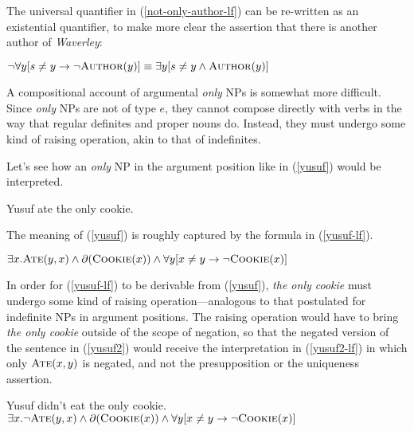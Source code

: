 The universal quantifier in (\ref{not-only-author-lf}) can be re-written as an existential quantifier, to make more clear the assertion that there is another author of \textit{Waverley}:

\begin{exe}
	\ex $\neg \forall y [ s \ne y \to \neg \textsc{Author}(y) ] \equiv \exists y [ s \ne y \land \textsc{Author}(y) ]$
\end{exe}

A compositional account of argumental \textit{only} NPs is somewhat more difficult. Since \textit{only} NPs are not of type $e$, they cannot compose directly with verbs in the way that regular definites and proper nouns do. Instead, they must undergo some kind of raising operation, akin to that of indefinites.


Let's see how an \textit{only} NP in the argument position like in (\ref{yusuf}) would be interpreted.

\begin{exe}
	\ex \label{yusuf} Yusuf ate the only cookie.
\end{exe}

The meaning of (\ref{yusuf}) is roughly captured by the formula in (\ref{yusuf-lf}).

\begin{exe}
	\ex \label{yusuf-lf} $\exists x . \textsc{Ate}(y, x) \land \partial(\textsc{Cookie}(x)) \land \forall y [ x \ne y \to \neg \textsc{Cookie}(x) ]$
\end{exe}

In order for (\ref{yusuf-lf}) to be derivable from (\ref{yusuf}), \textit{the only cookie} must undergo some kind of raising operation---analogous to that postulated for indefinite NPs in argument positions. The raising operation would have to bring \textit{the only cookie} outside of the scope of negation, so that the negated version of the sentence in (\ref{yusuf2}) would receive the interpretation in (\ref{yusuf2-lf}) in which only $\textsc{Ate}(x, y)$ is negated, and not the presupposition or the uniqueness assertion.

\begin{exe}
	\ex \label{yusuf2} Yusuf didn't eat the only cookie.
	\ex \label{yusuf2-lf} $\exists x . \neg\textsc{Ate}(y, x) \land \partial(\textsc{Cookie}(x)) \land \forall y [ x \ne y \to \neg \textsc{Cookie}(x) ]$
\end{exe}

